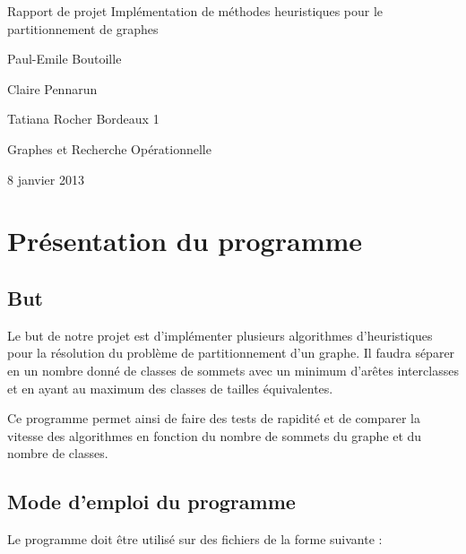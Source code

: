 \documentclass[12pt]{article}
\begin{document}
\begin{titlepage}
\begin{center}

\hfill
\vfill
\bigskip
\huge{Rapport de projet} 
\vfill
\bigskip 
\Huge 
\bigskip Implémentation de méthodes heuristiques pour le partitionnement de graphes \par 
\vfill
\Large Paul-Emile Boutoille \par
		Claire Pennarun \par 
		Tatiana Rocher
\vfill
\Large Bordeaux 1 \par \Large Graphes et Recherche Opérationnelle		
		\bigskip 
\bigskip

\Large
8 janvier 2013
\end{center}
\end{titlepage}

\tableofcontents
\newpage

\section{Présentation du programme}

\subsection{But}

Le but de notre projet est d'implémenter plusieurs algorithmes d’heuristiques pour la résolution du problème de partitionnement d’un graphe. Il faudra séparer en un nombre donné de classes de sommets avec un minimum d'arêtes interclasses et en ayant au maximum des classes de tailles équivalentes. 
~\par Ce programme permet ainsi de faire des tests de rapidité et de comparer la vitesse des algorithmes en fonction du nombre de sommets du graphe et du nombre de classes.

\subsection{Mode d'emploi du programme}

Le programme doit être utilisé sur des fichiers de la forme suivante :
~\\

~\\
~\\
\end{document}
